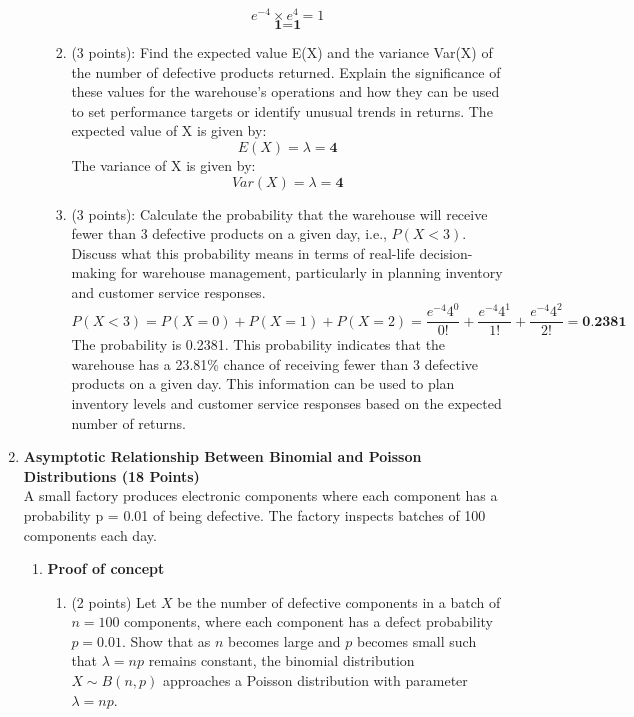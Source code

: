 \documentclass[a3paper,12pt]{article} %
\begin{document}
\begin{enumerate}
\begin{enumerate}
\begin{enumerate}
\[            e^{-4} \times e^{4} = 1
            \]
            \[
            \textbf{1} = \textbf{1}
            \]
            \item (3 points): Find the expected value E(X) and the variance Var(X) of the number of defective products returned. Explain the significance of these values for the warehouse’s operations and how they can be used to set performance targets or identify unusual trends in returns.
            The expected value of X is given by:
            \[
            E(X) = \lambda = \textbf{4}
            \]
            The variance of X is given by:
            \[
            Var(X) = \lambda = \textbf{4}
            \]
            \item (3 points): Calculate the probability that the warehouse will receive fewer than 3 defective products on a given day, i.e., \(P(X < 3)\). Discuss what this probability means in terms of real-life decision-making for warehouse management, particularly in planning inventory and customer service responses.
            \[
            P(X < 3) = P(X = 0) + P(X = 1) + P(X = 2) = \frac{e^{-4} 4^0}{0!} + \frac{e^{-4} 4^1}{1!} + \frac{e^{-4} 4^2}{2!} = \textbf{0.2381}
            \]
            The probability is 0.2381. This probability indicates that the warehouse has a 23.81\% chance of receiving fewer than 3 defective products on a given day. This information can be used to plan inventory levels and customer service responses based on the expected number of returns.
        \end{enumerate}
    \end{enumerate}
    \newpage
    \item \textbf{Asymptotic Relationship Between Binomial and Poisson Distributions (18 Points)}
    \\ A small factory produces electronic components where each component has a probability p = 0.01 of being defective. The factory inspects batches of 100 components each day.
    \begin{enumerate}
        \item \textbf{Proof of concept}
        \begin{enumerate}
            \item (2 points) Let \( X \) be the number of defective components in a batch of \( n = 100 \) components, where each component has a defect probability \( p = 0.01 \). Show that as \( n \) becomes large and \( p \) becomes small such that \( \lambda = np \) remains constant, the binomial distribution \( X \sim B(n, p) \) approaches a Poisson distribution with parameter \( \lambda = np \).

\end{enumerate}
\end{enumerate}
\end{enumerate}
\end{document}
